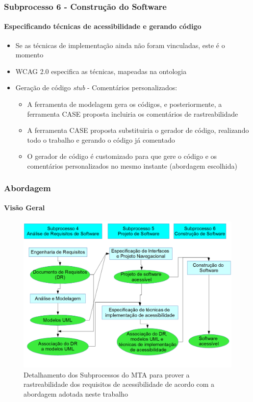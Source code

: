 \documentclass{beamer}
\begin{document}
\begin{frame}
\frametitle{Subprocesso 6 - Construção do Software}
\framesubtitle{Especificando técnicas de acessibilidade e gerando código}

\begin{itemize}
  \item Se as técnicas de implementação ainda não foram vinculadas, este é o momento
  \item WCAG 2.0 especifica as técnicas, mapeadas na ontologia
  \item Geração de código \textit{stub} - Comentários personalizados:
  	\begin{itemize}
  	  \item A ferramenta de modelagem gera os códigos, e posteriormente, a ferramenta CASE proposta incluiria os comentários de rastreabilidade
  	  \item A ferramenta CASE proposta substituiria o gerador de código, realizando todo o trabalho e gerando o código já comentado
  	  \item O gerador de código é customizado para que gere o código e os comentários personalizados no mesmo instante (abordagem escolhida)
  	\end{itemize}
\end{itemize}

\end{frame}

\begin{frame}
\frametitle{Abordagem}
\framesubtitle{Visão Geral}

\begin{figure}[htbp] \centering
	\includegraphics[width=\textwidth,height=.65\textheight,keepaspectratio]{./img/figuramagica.png}
	\caption{Detalhamento dos Subprocessos do MTA para prover a rastreabilidade dos requisitos de acessibilidade de acordo com a abordagem adotada neste trabalho}
	\label{fig:figuramagica}
\end{figure}

\end{frame}
\end{document}

